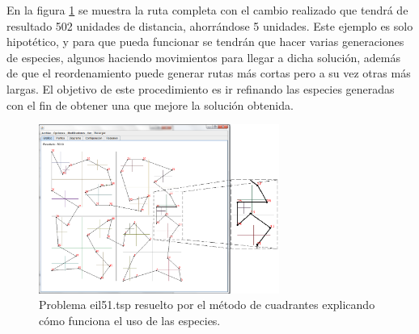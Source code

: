 \hspace*{1cm}En la figura \ref {fig:eil51_recocido.png} se muestra la ruta completa con el cambio realizado que tendrá de resultado 502 unidades de distancia, ahorrándose 5 unidades. Este ejemplo es solo hipotético, y para que pueda funcionar se tendrán que hacer varias generaciones de especies, algunos haciendo movimientos para llegar a dicha solución, además de que el reordenamiento puede generar rutas más cortas pero a su vez otras más largas. El objetivo de este procedimiento es ir refinando las especies generadas con el fin de obtener una que mejore la solución obtenida.
     \begin{figure}[hbtp]
        \centering
            \includegraphics[width=0.7\textwidth]{PruebasResultados/Imagenes/eil51_recocido_recuadro.png}
            \caption{Problema eil51.tsp resuelto por el método de cuadrantes explicando cómo funciona el uso de las especies.}
            \label{fig:eil51_recocido.png}
    \end{figure}    